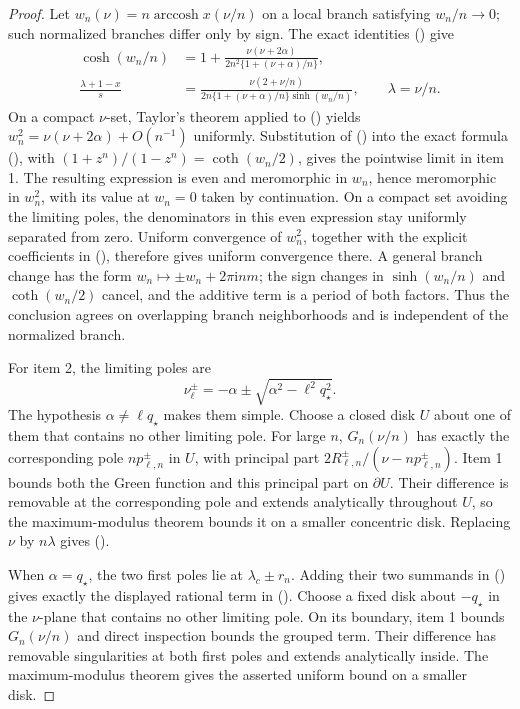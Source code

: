 \documentclass[twoside,10pt]{article}
\numberwithin{equation}{section}
\theoremstyle{slbody}
\theoremstyle{definition}
\theoremstyle{remark}
\renewcommand{\eqref}[1]{%
  \textup{{\normalfont(\oldstylenums{\ref{#1}}}\normalfont)}}
\begin{document}
\begin{proof}
Let $w_n(\nu)=n\operatorname{arccosh}x(\nu/n)$ on a local branch
satisfying $w_n/n\to0$; such normalized branches differ only by sign.
The exact identities \eqref{eq:fixed-exact-x-identities} give
\begin{align}
 \cosh(w_n/n)
 &=1+\frac{\nu(\nu+2\alpha)}
           {2n^2\{1+(\nu+\alpha)/n\}},
 \label{eq:critical-exact-w}\\
 \frac{\lambda+1-x}{s}
 &=\frac{\nu(2+\nu/n)}
 {2n\{1+(\nu+\alpha)/n\}\sinh(w_n/n)},
 \qquad \lambda=\nu/n.\label{eq:critical-exact-coefficient}
\end{align}
On a compact $\nu$-set, Taylor's theorem applied to
\eqref{eq:critical-exact-w} yields
$w_n^2=\nu(\nu+2\alpha)+O(n^{-1})$ uniformly.  Substitution of
\eqref{eq:critical-exact-coefficient} into the exact formula
\eqref{eq:finite-green-z}, with
$(1+z^n)/(1-z^n)=\coth(w_n/2)$, gives the pointwise limit in item 1.
The resulting expression is even and meromorphic in $w_n$, hence
meromorphic in $w_n^2$, with its value at $w_n=0$ taken by continuation.
On a compact set avoiding the limiting poles, the denominators in this
even expression stay uniformly separated from zero.  Uniform convergence
of $w_n^2$, together with the explicit coefficients in
\eqref{eq:critical-exact-coefficient}, therefore gives uniform convergence
there.  A general branch change has the form
$w_n\mapsto\pm w_n+2\pi\mathrm i n m$; the sign changes in
$\sinh(w_n/n)$ and $\coth(w_n/2)$ cancel, and the additive term is a
period of both factors.  Thus the conclusion agrees on overlapping
branch neighborhoods and is independent of the normalized branch.

For item 2, the limiting poles are
\[
 \nu_\ell^\pm=-\alpha\pm
       \sqrt{\alpha^2-\ell^2q_\star^2}.
\]
The hypothesis $\alpha\ne\ell q_\star$ makes them simple.  Choose a closed
disk $U$ about one of them that contains no other limiting pole.  For
large $n$, $G_n(\nu/n)$ has exactly the corresponding pole
$np_{\ell,n}^\pm$ in $U$, with principal part
$2R_{\ell,n}^\pm/(\nu-np_{\ell,n}^\pm)$.  Item 1 bounds both the Green
function and this principal part on $\partial U$.  Their difference is
removable at the corresponding pole and extends analytically throughout
$U$, so the maximum-modulus theorem bounds it on a smaller concentric
disk.  Replacing $\nu$ by $n\lambda$ gives
\eqref{eq:critical-simple-regular-bound}.

When $\alpha=q_\star$, the two first poles lie at
$\lambda_c\pm r_n$.  Adding their two summands in
\eqref{eq:Gfinite} gives exactly the displayed rational term in
\eqref{eq:critical-grouped-green}.  Choose a fixed disk about $-q_\star$ in
the $\nu$-plane that contains no other limiting pole.  On its boundary,
item 1 bounds $G_n(\nu/n)$ and direct inspection bounds the grouped
term.  Their difference has removable singularities at both first poles
and extends analytically inside.  The maximum-modulus theorem gives the
asserted uniform bound on a smaller disk.


\end{proof}
\end{document}
